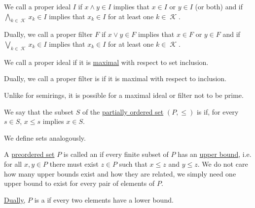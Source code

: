 \begin{definition}
\begin{thmenum}
    \begin{minipage}[t]{0.45\textwidth}
      We call a proper ideal \( I \)  if \( {x \wedge y \in I} \) implies that \( x \in I \) or \( y \in I \) (or both) and  if \( \bigwedge_{k \in \mscrK} x_k \in I \) implies that \( x_k \in I \) for at least one \( k \in \mscrK \).
    \end{minipage}
    \hspace{0.02\textwidth}
    \begin{minipage}[t]{0.45\textwidth}
      Dually, we call a proper filter \( F \)  if \( x \vee y \in F \) implies that \( x \in F \) or \( y \in F \) and  if \( \bigvee_{k \in \mscrK} x_k \in I \) implies that \( x_k \in I \) for at least one \( k \in \mscrK \).
    \end{minipage}

    \begin{minipage}[t]{0.45\textwidth}
      We call a proper ideal  if it is \hyperref[def:extremal_points/maximal_and_minimal_element]{maximal} with respect to set inclusion.
    \end{minipage}
    \hspace{0.02\textwidth}
    \begin{minipage}[t]{0.45\textwidth}
      Dually, we call a proper filter is  if it is maximal with respect to inclusion.

      Unlike for semirings, it is possible for a maximal ideal or filter not to be prime.
    \end{minipage}
  \end{thmenum}
\end{definition}

\begin{definition}\label{def:closed_ordered_subset}
  We say that the subset \( S \) of the \hyperref[def:partially_ordered_set]{partially ordered set} \( (P, \leq) \) is  if, for every \( s \in S \), \( x \leq s \) implies \( x \in S \).

  We define  sets analogously.
\end{definition}

\begin{definition}\label{def:directed_set}
  A \hyperref[def:preordered_set]{preordered set} \( P \) is called an  if every finite subset of \( P \) has an \hyperref[def:extremal_points/upper_and_lower_bounds]{upper bound}, i.e. for all \( x, y \in P \) there must exist \( z \in P \) such that \( x \leq z \) and \( y \leq z \). We do not care how many upper bounds exist and how they are related, we simply need one upper bound to exist for every pair of elements of \( P \).

  \hyperref[thm:preorder_duality]{Dually}, \( P \) is a  if every two elements have a lower bound.
\end{definition}

